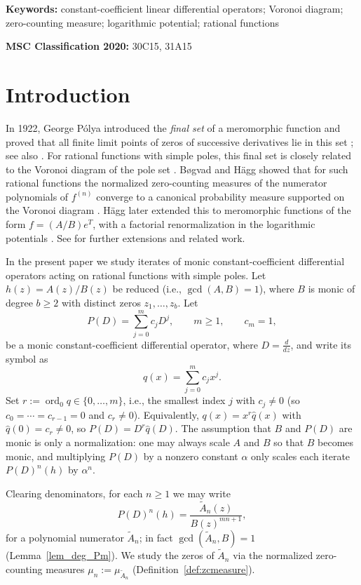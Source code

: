 \documentclass[12pt]{article}
\theoremstyle{plain}
\theoremstyle{definition}
\begin{document}
\noindent\textbf{Keywords:} constant-coefficient linear differential operators; Voronoi diagram; zero-counting measure; logarithmic potential; rational functions

\noindent\textbf{MSC Classification 2020:} 30C15, 31A15

\section{Introduction}\label{sec1}

In 1922, George P\'olya introduced the \emph{final set} of a meromorphic function and proved that all finite limit points of zeros of successive derivatives lie in this set \cite{GP}; see also \cite{Polya}.
For rational functions with simple poles, this final set is closely related to the Voronoi diagram of the pole set \cite{Hayman}.
B\o gvad and H\"agg showed that for such rational functions the normalized zero-counting measures of the numerator polynomials of $f^{(n)}$ converge to a canonical probability measure supported on the Voronoi diagram \cite{B:H}.
H\"agg later extended this to meromorphic functions of the form $f=(A/B)e^T$, with a factorial renormalization in the logarithmic potentials \cite{Hagg}.
See \cite{PJS,PJS1,Weiss,BSTW,Robert} for further extensions and related work.

In the present paper we study iterates of monic constant-coefficient differential operators acting on rational functions with simple poles.
Let $h(z)=A(z)/B(z)$ be reduced (i.e., $\gcd(A,B)=1$), where $B$ is monic of degree $b\ge2$ with distinct zeros $z_1,\dots,z_b$.
Let
$$P(D)=\sum_{j=0}^{m}c_jD^j,\qquad m\ge1,\qquad c_m=1,$$
be a monic constant-coefficient differential operator, where $D=\frac{d}{dz}$, and write its symbol as
$$q(x)=\sum_{j=0}^{m}c_jx^j.$$
Set $r:=\operatorname{ord}_0 q\in\{0,\dots,m\}$, i.e., the smallest index $j$ with $c_j\neq0$ (so $c_0=\cdots=c_{r-1}=0$ and $c_r\neq0$). Equivalently, $q(x)=x^r\widehat q(x)$ with $\widehat q(0)=c_r\neq0$, so $P(D)=D^r\widehat q(D)$.
The assumption that $B$ and $P(D)$ are monic is only a normalization: one may always scale $A$ and $B$ so that $B$ becomes monic, and multiplying $P(D)$ by a nonzero constant $\alpha$ only scales each iterate $P(D)^n(h)$ by $\alpha^n$.

Clearing denominators, for each $n\ge1$ we may write
$$P(D)^n(h)=\frac{\widetilde A_n(z)}{B(z)^{mn+1}},$$
for a polynomial numerator $\widetilde A_n$; in fact $\gcd(\widetilde A_n,B)=1$ (Lemma~\ref{lem_deg_Pm}).
We study the zeros of $\widetilde A_n$ via the normalized zero-counting measures $\mu_n:=\mu_{\widetilde A_n}$ (Definition~\ref{def:zcmeasure}).
\end{document}
